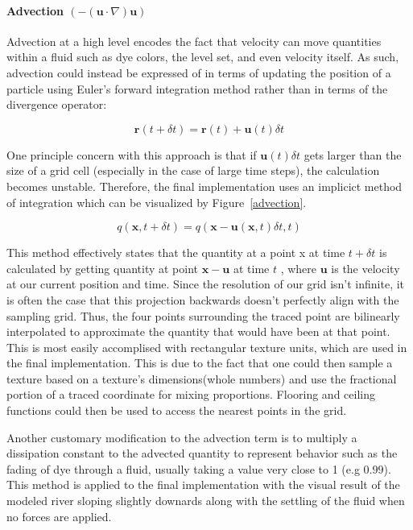 \documentclass[conference]{IEEEtran}
\begin{document}
\paragraph{Advection $(-(\mathbf{u} \cdot \nabla) \mathbf{u})$} Advection at a high level encodes the fact that velocity can move quantities within a fluid such as dye colors, the level set, and even velocity itself. As such, advection could instead be expressed of in terms of updating the position of a particle using Euler's forward integration method rather than in terms of the divergence operator:

\begin{equation}
\mathbf{r}(t+\delta t)=\mathbf{r}(t)+\mathbf{u}(t) \delta t
\end{equation} 

One principle concern with this approach is that if $\mathbf{u}(t) \delta t$ gets larger than the size of a grid cell (especially in the case of large time steps), the calculation becomes unstable. Therefore, the final implementation uses an implicict method of integration which can be visualized by Figure~\ref{advection}.

\begin{equation}
q(\mathbf{x}, t+\delta t)=q(\mathbf{x}-\mathbf{u}(\mathbf{x}, t) \delta t, t)
\end{equation}

	This method effectively states that the quantity at a point x at time $t + \delta t$ is calculated by getting quantity at point $\mathbf{x} - \mathbf{u}$ at time $t$ , where $\mathbf{u}$ is the velocity at our current position and time. Since the resolution of our grid isn't infinite, it is often the case that this projection backwards doesn't perfectly align with the sampling grid.
Thus, the four points surrounding the traced point are bilinearly interpolated to approximate the quantity that would have been at that point. This is most easily accomplised with rectangular texture units, which are used in the final implementation.
This is due to the fact that one could then sample a texture based on a texture's dimensions(whole numbers) and use the fractional portion of a traced coordinate for mixing proportions. Flooring and ceiling functions could then be used to access the nearest points in the grid. 

Another customary modification to the advection term is to multiply a dissipation constant to the advected quantity to represent behavior such as the fading of dye through a fluid, usually taking a value very close to 1 (e.g $0.99$). This method is applied to the final implementation with the visual result of the modeled river sloping slightly downards along with the settling of the fluid when no forces are applied.
\end{document}
